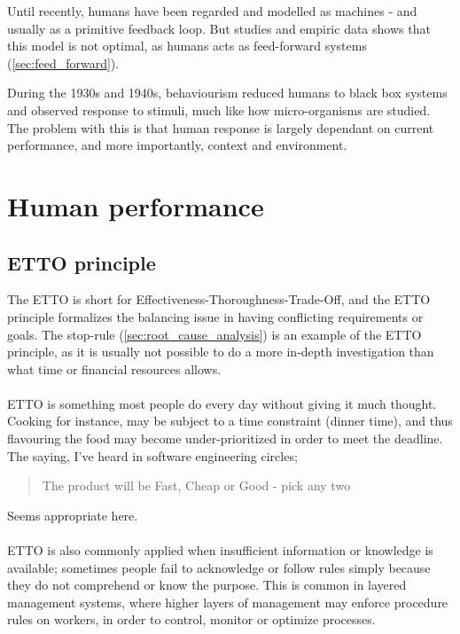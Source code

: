 Until recently, humans have been regarded and modelled as machines - and usually as a primitive feedback loop. But studies and empiric data shows that this model is not optimal, as humans acts as feed-forward systems (\ref{sec:feed_forward}).

During the 1930s and 1940s, behaviourism reduced humans to black box systems and observed response to stimuli, much like how micro-organisms are studied. The problem with this is that human response is largely dependant on current performance, and more importantly, context and environment.

\section{Human performance}
\label{sec:human_performance}

\subsection{ETTO principle}
\label{sec:etto_principle	}
The ETTO is short for Effectiveness-Thoroughness-Trade-Off, and the ETTO principle formalizes the balancing issue in having conflicting requirements or goals. The stop-rule (\ref{sec:root_cause_analysis}) is an example of the ETTO principle, as it is usually not possible to do a more in-depth investigation than what time or financial resources allows.\\
\\
ETTO is something most people do every day without giving it much thought. Cooking for instance, may be subject to a time constraint (dinner time), and thus flavouring the food may become under-prioritized in order to meet the deadline. The saying, I've heard in software engineering circles;
 \begin{quote}
 The product will be Fast, Cheap or Good - pick any two
\end{quote}
Seems appropriate here.\\
\\
ETTO is also commonly applied when insufficient information or knowledge is available; sometimes people fail to acknowledge or follow rules simply because they do not comprehend or know the purpose. This is common in layered management systems, where higher layers of management may enforce procedure rules on workers, in order to control, monitor or optimize processes.

